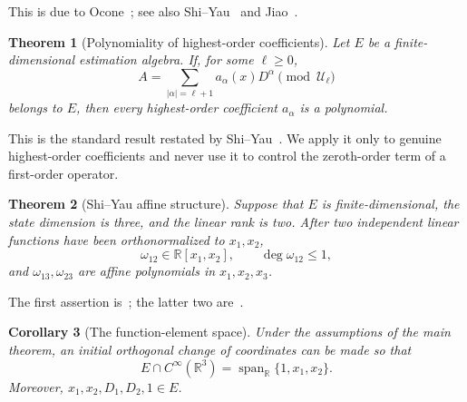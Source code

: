 \documentclass[11pt,a4paper]{article}
\numberwithin{equation}{section}
\theoremstyle{journalplain}
\newtheorem{theorem}{Theorem}[section]
\newtheorem{corollary}[theorem]{Corollary}
\theoremstyle{journaldef}
\DeclareMathOperator{\Span}{span}
\newcommand{\R}{\mathbb R}
\newcommand{\U}{\mathcal U}
\begin{document}
\noindent
This is due to Ocone~\cite{Ocone1981}; see also
Shi--Yau~\cite[Theorem 2.7, p.~4230]{ShiYau2017} and
Jiao~\cite[Theorem 2.4, p.~25]{Jiao2022}.

\begin{theorem}[Polynomiality of highest-order coefficients]\label{thm:top-coeff}
Let $E$ be a finite-dimensional estimation algebra.  If, for some
$\ell\ge0$,
\[
A=\sum_{|\alpha|=\ell+1}a_\alpha(x)D^\alpha
\pmod{\U_\ell}
\]
belongs to $E$, then every highest-order coefficient $a_\alpha$ is a
polynomial.
\end{theorem}

\noindent
This is the standard result restated by
Shi--Yau~\cite[Theorem 2.9, p.~4230]{ShiYau2017}.  We apply it only to genuine
highest-order coefficients and never use it to control the zeroth-order term
of a first-order operator.

\begin{theorem}[Shi--Yau affine structure]\label{thm:shi-yau-affine}
Suppose that $E$ is finite-dimensional, the state dimension is three, and the
linear rank is two.  After two independent linear functions have been
orthonormalized to $x_1,x_2$,
\[
\omega_{12}\in\R[x_1,x_2],\qquad \deg\omega_{12}\le1,
\]
and $\omega_{13},\omega_{23}$ are affine polynomials in
$x_1,x_2,x_3$.
\end{theorem}

\noindent
The first assertion is~\cite[Theorem 3.4, p.~4233]{ShiYau2017}; the latter
two are~\cite[Theorem 3.10, pp.~4243--4245]{ShiYau2017}.

\begin{corollary}[The function-element space]\label{cor:function-space}
Under the assumptions of the main theorem, an initial orthogonal change of
coordinates can be made so that
\begin{equation}
E\cap C^\infty(\R^3)
=\Span_\R\{1,x_1,x_2\}.
\label{eq:function-space}
\end{equation}
Moreover, $x_1,x_2,D_1,D_2,1\in E$.
\end{corollary}
\end{document}
